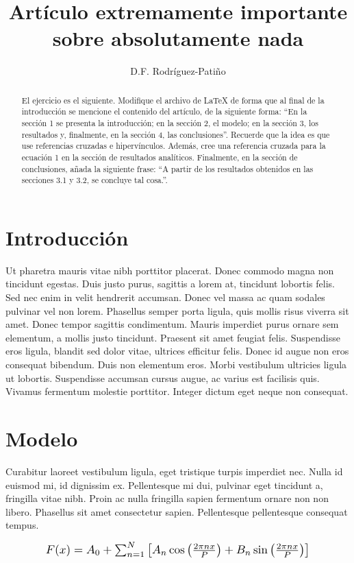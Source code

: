 \documentclass[11pt, twocolumn]{article}
\title{Artículo extremamente importante sobre absolutamente nada}
\author{D.F. Rodríguez-Patiño}
\date{}
\begin{document}
    \maketitle
    \begin{abstract}
        El ejercicio es el siguiente. Modifique el archivo de \LaTeX{} de forma que al final de la introducción se mencione el contenido del artículo, de la siguiente forma: ``En la sección 1 se presenta la introducción; en la sección 2, el modelo; en la sección 3, los resultados y, finalmente, en la sección 4, las conclusiones''. Recuerde que la idea es que use referencias cruzadas e hipervínculos. Además, cree una referencia cruzada para la ecuación 1 en la sección de resultados analíticos. Finalmente, en la sección de conclusiones, añada la siguiente frase: ``A partir de los resultados obtenidos en las secciones 3.1 y 3.2, se concluye tal cosa.''.
    \end{abstract}

    \section{Introducción}
    Ut pharetra mauris vitae nibh porttitor placerat. Donec commodo magna non tincidunt egestas. Duis justo purus, sagittis a lorem at, tincidunt lobortis felis. Sed nec enim in velit hendrerit accumsan. Donec vel massa ac quam sodales pulvinar vel non lorem. Phasellus semper porta ligula, quis mollis risus viverra sit amet. Donec tempor sagittis condimentum. Mauris imperdiet purus ornare sem elementum, a mollis justo tincidunt. Praesent sit amet feugiat felis. Suspendisse eros ligula, blandit sed dolor vitae, ultrices efficitur felis. Donec id augue non eros consequat bibendum. Duis non elementum eros. Morbi vestibulum ultricies ligula ut lobortis. Suspendisse accumsan cursus augue, ac varius est facilisis quis. Vivamus fermentum molestie porttitor. Integer dictum eget neque non consequat.

    \section{Modelo}
    Curabitur laoreet vestibulum ligula, eget tristique turpis imperdiet nec. Nulla id euismod mi, id dignissim ex. Pellentesque mi dui, pulvinar eget tincidunt a, fringilla vitae nibh. Proin ac nulla fringilla sapien fermentum ornare non non libero. Phasellus sit amet consectetur sapien. Pellentesque pellentesque consequat tempus. 

    \begin{equation}
    \resizebox{0.8\columnwidth}{!} {$F(x) = A_0 + \sum_{n=1}^{N} \left[A_n \cos\left(\frac{2\pi nx}{P}\right) + B_n \sin\left(\frac{2\pi nx}{P}\right)\right]$}
    \end{equation}
    
\end{document}
